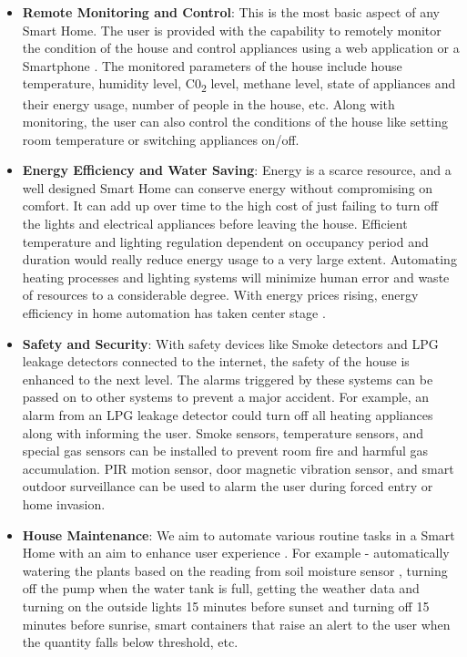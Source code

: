 \begin{itemize}
\item \textbf{Remote Monitoring and Control}:
This is the most basic aspect of any Smart Home. The user is provided with the capability to remotely monitor the condition of the house and control appliances using a web application or a Smartphone \cite{41}. The monitored parameters of the house include house temperature, humidity level, C0\textsubscript{2} level, methane level, state of appliances and their energy usage, number of people in the house, etc. Along with monitoring, the user can also control the conditions of the house like setting room temperature or switching appliances on/off.

\item \textbf{Energy Efficiency and Water Saving}:
Energy is a scarce resource, and a well designed Smart Home can conserve energy without compromising on comfort. It can add up over time to the high cost of just failing to turn off the lights and electrical appliances before leaving the house. Efficient temperature and lighting regulation dependent on occupancy period and duration would really reduce energy usage to a very large extent. Automating heating processes and lighting systems will minimize human error and waste of resources to a considerable degree. With energy prices rising, energy efficiency in home automation has taken center stage \cite{42}. 

\item \textbf{Safety and Security}:
With safety devices like Smoke detectors \cite{39} and LPG leakage detectors connected to the internet, the safety of the house is enhanced to the next level. The alarms triggered by these systems can be passed on to other systems to prevent a major accident. For example, an alarm from an LPG leakage detector could turn off all heating appliances along with informing the user. Smoke sensors, temperature sensors, and special gas sensors can be installed to prevent room fire and harmful gas accumulation. PIR motion sensor, door magnetic vibration sensor, and smart outdoor surveillance can be used to alarm the user during forced entry or home invasion. 

\item \textbf{House Maintenance}:
We aim to automate various routine tasks in a Smart Home with an aim to enhance user experience \cite{34}. For example - automatically watering the plants based on the reading from soil moisture sensor \cite{35}, turning off the pump when the water tank is full, getting the weather data and turning on the outside lights 15 minutes before sunset and turning off 15 minutes before sunrise, smart containers that raise an alert to the user when the quantity falls below threshold, etc. 


\end{itemize}
